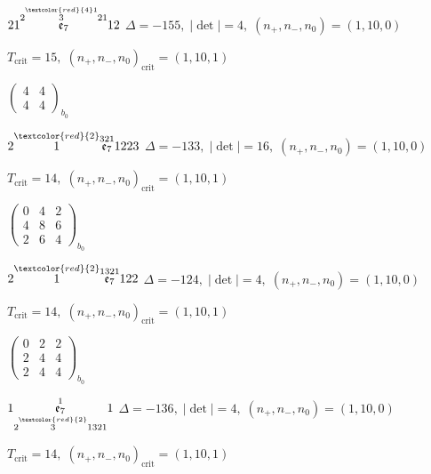 \documentclass[10pt]{article}
\begin{document}
$21\overset{2\overset{\textcolor{red}{4}1}{3}21}{\mathfrak{e}_7}12$ \quad $\Delta=-155,\; |\det|=4,\; (n_+,n_-,n_0)=(1,10,0)$

\hspace{1em}$T_{\text{crit}}=15,\; (n_+,n_-,n_0)_{\text{crit}}=(1,10,1)$

\hspace{2em}$\left(\begin{smallmatrix}4 & 4 \\ 4 & 4\end{smallmatrix}\right)_{\!b_0}$

\smallskip

$2\overset{\textcolor{red}{2}}{1}\overset{321}{\mathfrak{e}_7}1223$ \quad $\Delta=-133,\; |\det|=16,\; (n_+,n_-,n_0)=(1,10,0)$

\hspace{1em}$T_{\text{crit}}=14,\; (n_+,n_-,n_0)_{\text{crit}}=(1,10,1)$

\hspace{2em}$\left(\begin{smallmatrix}0 & 4 & 2 \\ 4 & 8 & 6 \\ 2 & 6 & 4\end{smallmatrix}\right)_{\!b_0}$

\smallskip

$2\overset{\textcolor{red}{2}}{1}\overset{1321}{\mathfrak{e}_7}122$ \quad $\Delta=-124,\; |\det|=4,\; (n_+,n_-,n_0)=(1,10,0)$

\hspace{1em}$T_{\text{crit}}=14,\; (n_+,n_-,n_0)_{\text{crit}}=(1,10,1)$

\hspace{2em}$\left(\begin{smallmatrix}0 & 2 & 2 \\ 2 & 4 & 4 \\ 2 & 4 & 4\end{smallmatrix}\right)_{\!b_0}$

\smallskip

$1\overset{1}{\underset{2\overset{\textcolor{red}{2}}{3}1321}{\mathfrak{e}_7}}1$ \quad $\Delta=-136,\; |\det|=4,\; (n_+,n_-,n_0)=(1,10,0)$

\hspace{1em}$T_{\text{crit}}=14,\; (n_+,n_-,n_0)_{\text{crit}}=(1,10,1)$
\end{document}
